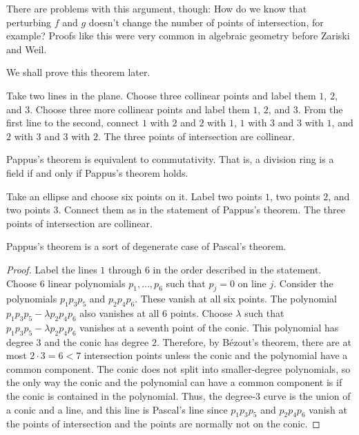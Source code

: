 \documentclass [11 pt, oneside] {article}
\begin{document}
There are problems with this argument, though: How do we know that perturbing $f$ and $g$ doesn't change the number of points of intersection, for example? Proofs like this were very common in algebraic geometry before Zariski and Weil.

We shall prove this theorem later.

\begin{theorem}[Pappus]\label{}
Take two lines in the plane. Choose three collinear points and label them $1$, $2$, and $3$. Choose three more collinear points and label them $1$, $2$, and $3$. From the first line to the second, connect $1$ with $2$ and $2$ with $1$, $1$ with $3$ and $3$ with $1$, and $2$ with $3$ and $3$ with $2$. The three points of intersection are collinear.
\end{theorem}

\begin{remark}
	Pappus's theorem is equivalent to commutativity. That is, a division ring is a field if and only if Pappus's theorem holds.
\end{remark}

\begin{theorem}[Pascal]\label{}
Take an ellipse and choose six points on it. Label two points $1$, two points $2$, and two points $3$. Connect them as in the statement of Pappus's theorem. The three points of intersection are collinear. 
\end{theorem}

\begin{remark}
	Pappus's theorem is a sort of degenerate case of Pascal's theorem.
\end{remark}

\begin{proof}
Label the lines $1$ through $6$ in the order described in the statement. Choose $6$ linear polynomials $p_1,\hdots, p_{6}$ such that $p_j = 0$ on line $j$. Consider the polynomials $p_1p_3p_5$ and $p_2p_4p_6$. These vanish at all six points. The polynomial $p_1p_3p_5 - \lambda p_2p_4p_6$ also vanishes at all $6$ points. Choose $\lambda$ such that $p_1p_3p_5 - \lambda p_2p_4p_6$ vanishes at a seventh point of the conic. This polynomial has degree $3$ and the conic has degree $2$. Therefore, by B\'ezout's theorem, there are at most $2\cdot 3 = 6<7$ intersection points unless the conic and the polynomial have a common component. The conic does not split into smaller-degree polynomials, so the only way the conic and the polynomial can have a common component is if the conic is contained in the polynomial. Thus, the degree-$3$ curve is the union of a conic and a line, and this line is Pascal's line since $p_1p_3p_5$ and $p_2p_4p_6$ vanish at the points of intersection and the points are normally not on the conic. 
\end{proof}
\end{document}
